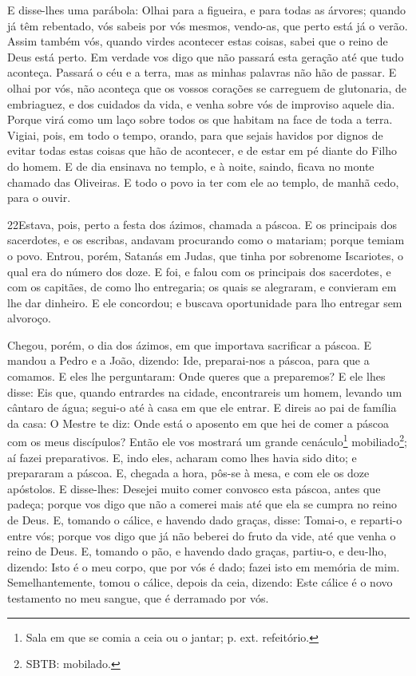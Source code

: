 E disse-lhes uma parábola: Olhai para a figueira, e para todas as
árvores; quando já têm rebentado, vós sabeis por vós mesmos,
vendo-as, que perto está já o verão. Assim também vós, quando
virdes acontecer estas coisas, sabei que o reino de Deus está perto.
Em verdade vos digo que não passará esta geração até que tudo
aconteça. Passará o céu e a terra, mas as minhas palavras não
hão de passar. E olhai por vós, não aconteça que os vossos
corações se carreguem de glutonaria, de embriaguez, e dos cuidados
da vida, e venha sobre vós de improviso aquele dia. Porque
virá como um laço sobre todos os que habitam na face de toda a
terra. Vigiai, pois, em todo o tempo, orando, para que sejais
havidos por dignos de evitar todas estas coisas que hão de
acontecer, e de estar em pé diante do Filho do homem. E de
dia ensinava no templo, e à noite, saindo, ficava no monte chamado
das Oliveiras. E todo o povo ia ter com ele ao templo, de
manhã cedo, para o ouvir.

\medskip

\lettrine{22} Estava, pois, perto a festa dos ázimos, chamada
a páscoa. E os principais dos sacerdotes, e os escribas, andavam
procurando como o matariam; porque temiam o povo. Entrou, porém,
Satanás em Judas, que tinha por sobrenome Iscariotes, o qual era do
número dos doze. E foi, e falou com os principais dos
sacerdotes, e com os capitães, de como lho entregaria; os quais
se alegraram, e convieram em lhe dar dinheiro. E ele concordou;
e buscava oportunidade para lho entregar sem alvoroço.

Chegou, porém, o dia dos ázimos, em que importava sacrificar a
páscoa. E mandou a Pedro e a João, dizendo: Ide, preparai-nos a
páscoa, para que a comamos. E eles lhe perguntaram: Onde queres
que a preparemos? E ele lhes disse: Eis que, quando entrardes
na cidade, encontrareis um homem, levando um cântaro de água;
segui-o até à casa em que ele entrar. E direis ao pai de
família da casa: O Mestre te diz: Onde está o aposento em que hei de
comer a páscoa com os meus discípulos? Então ele vos mostrará
um grande cenáculo\footnote{Sala em que se comia a ceia ou o jantar;
p. ext. refeitório.} mobiliado\footnote{SBTB: mobilado.}; aí fazei
preparativos. E, indo eles, acharam como lhes havia sido
dito; e prepararam a páscoa. E, chegada a hora, pôs-se à
mesa, e com ele os doze apóstolos. E disse-lhes: Desejei
muito comer convosco esta páscoa, antes que padeça; porque
vos digo que não a comerei mais até que ela se cumpra no reino de
Deus. E, tomando o cálice, e havendo dado graças, disse:
Tomai-o, e reparti-o entre vós; porque vos digo que já não
beberei do fruto da vide, até que venha o reino de Deus. E,
tomando o pão, e havendo dado graças, partiu-o, e deu-lho, dizendo:
Isto é o meu corpo, que por vós é dado; fazei isto em memória de
mim. Semelhantemente, tomou o cálice, depois da ceia,
dizendo: Este cálice é o novo testamento no meu sangue, que é
derramado por vós.

